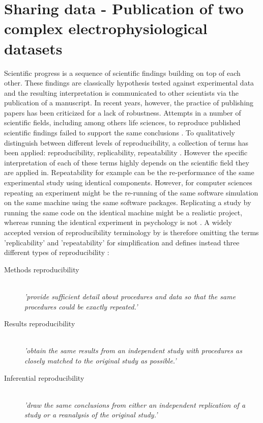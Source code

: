 \clearpage
\section{Sharing data - Publication of two complex electrophysiological datasets}
\label{sec:data}

Scientific progress is a sequence of scientific findings building on top of each other. These findings are classically hypothesis tested against experimental data and the resulting interpretation is communicated to other scientists via the publication of a manuscript. In recent years, however, the practice of publishing papers has been criticized for a lack of robustness. Attempts in a number of scientific fields, including among others life sciences, to reproduce published scientific findings failed to support the same conclusions \citep{Baker_2016, Fidler_2017, Pashler_2012, Ioannidis_2005, Goodman_2007, Ioannidis_2007, OpenScienceCollaboration_2015}. To qualitatively distinguish between different levels of reproducibility, a collection of terms has been applied: reproducibility, replicability, repeatability \citep{Plesser_2018, Drummond_2009}. However the specific interpretation of each of these terms highly depends on the scientific field they are applied in. Repeatability for example can be the re-performance of the same experimental study using identical components. However, for computer sciences repeating an experiment might be the re-running of the same software simulation on the same machine using the same software packages. Replicating a study by running the same code on the identical machine might be a realistic project, whereas running the identical experiment in psychology is not \citep{Anderson_2016}. A widely accepted version of reproducibility terminology by \citet{Goodman_2007} is therefore omitting the terms 'replicability' and 'repeatability' for simplification and defines instead three different types of reproducibility \citep[from][]{Plesser_2018}:

\begin{description}
 \item[Methods reproducibility] \hfill \\ \textit{'provide sufficient detail about procedures and data so that the same procedures could be exactly repeated.'}
\item[Results reproducibility] \hfill \\ \textit{'obtain the same results from an independent study with procedures as closely matched to the original study as possible.'}
\item[Inferential reproducibility] \hfill \\ \textit{'draw the same conclusions from either an independent replication of a study or a reanalysis of the original study.'}
\end{description}


